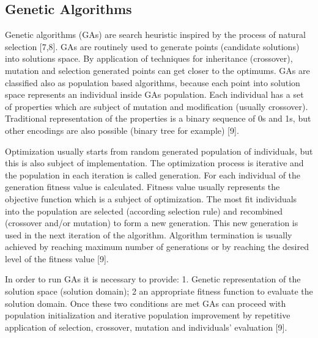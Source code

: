 \documentclass{llncs}
\begin{document}
\subsection{Genetic Algorithms}
%
Genetic algorithms (GAs) are search heuristic inspired by the process of natural selection [7,8]. GAs are routinely used to generate points (candidate solutions) into solutions space. By application of techniques for inheritance (crossover), mutation and selection generated points can get closer to the optimums. GAs are classified also as population based algorithms, because each point into solution space represents an individual inside GAs population. Each individual has a set of properties which are subject of mutation and modification (usually crossover). Traditional representation of the properties is a binary sequence of 0s and 1s, but other encodings are also possible (binary tree for example) [9].

Optimization usually starts from random generated population of individuals, but this is also subject of implementation. The optimization process is iterative and the population in each iteration is called generation. For each individual of the generation fitness value is calculated. Fitness value usually represents the objective function which is a subject of optimization. The most fit individuals into the population are selected (according selection rule) and recombined (crossover and/or mutation) to form a new generation. This new generation is used in the next iteration of the algorithm. Algorithm termination is usually achieved by reaching maximum number of generations or by reaching the desired level of the fitness value [9].

In order to run GAs it is necessary to provide: 1. Genetic representation of the solution space (solution domain); 2 an appropriate fitness function to evaluate the solution domain. Once these two conditions are met GAs can proceed with population initialization and iterative population improvement by repetitive application of selection, crossover, mutation and individuals’ evaluation [9].
%
\end{document}
